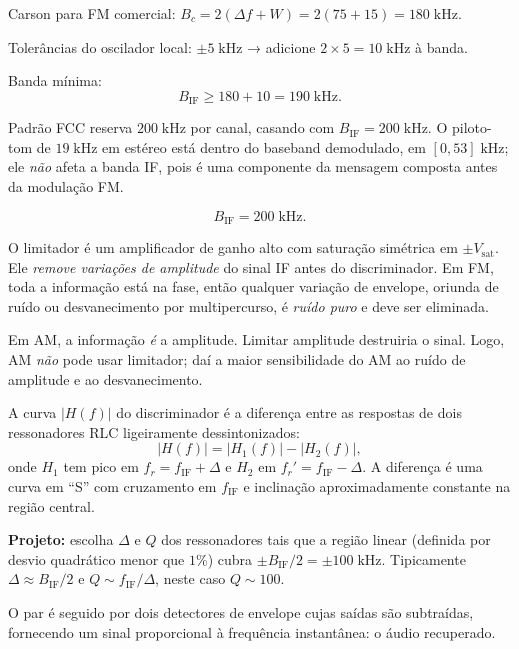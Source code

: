\documentclass[11pt,a4paper]{article}
\begin{document}
\begin{resolucao}

Carson para FM comercial: $B_c = 2(\Delta f + W) = 2(75 + 15) = 180\;\text{kHz}$.

Tolerâncias do oscilador local: $\pm 5\;\text{kHz}$ → adicione $2 \times 5 = 10\;\text{kHz}$ à banda.

Banda mínima:
\[
  B_{\text{IF}} \ge 180 + 10 = 190\;\text{kHz}.
\]

Padrão FCC reserva $200\;\text{kHz}$ por canal, casando com $B_{\text{IF}} = 200\;\text{kHz}$. O piloto-tom de $19\;\text{kHz}$ em estéreo está dentro do baseband demodulado, em $[0, 53]\;\text{kHz}$; ele \emph{não} afeta a banda IF, pois é uma componente da mensagem composta antes da modulação FM.

\[
  \boxed{B_{\text{IF}} = 200\;\text{kHz}.}
\]
\end{resolucao}

\begin{resolucao}

O limitador é um amplificador de ganho alto com saturação simétrica em $\pm V_{\text{sat}}$. Ele \emph{remove variações de amplitude} do sinal IF antes do discriminador. Em FM, toda a informação está na fase, então qualquer variação de envelope, oriunda de ruído ou desvanecimento por multipercurso, é \emph{ruído puro} e deve ser eliminada.

Em AM, a informação \emph{é} a amplitude. Limitar amplitude destruiria o sinal. Logo, AM \emph{não} pode usar limitador; daí a maior sensibilidade do AM ao ruído de amplitude e ao desvanecimento.
\end{resolucao}

\begin{resolucao}

A curva $|H(f)|$ do discriminador é a diferença entre as respostas de dois ressonadores RLC ligeiramente dessintonizados:
\[
  |H(f)| = |H_1(f)| - |H_2(f)|,
\]
onde $H_1$ tem pico em $f_r = f_{\text{IF}} + \Delta$ e $H_2$ em $f_r' = f_{\text{IF}} - \Delta$. A diferença é uma curva em ``S'' com cruzamento em $f_{\text{IF}}$ e inclinação aproximadamente constante na região central.

\textbf{Projeto:} escolha $\Delta$ e $Q$ dos ressonadores tais que a região linear (definida por desvio quadrático menor que $1\%$) cubra $\pm B_{\text{IF}}/2 = \pm 100\;\text{kHz}$. Tipicamente $\Delta \approx B_{\text{IF}}/2$ e $Q \sim f_{\text{IF}}/\Delta$, neste caso $Q \sim 100$.

O par é seguido por dois detectores de envelope cujas saídas são subtraídas, fornecendo um sinal proporcional à frequência instantânea: o áudio recuperado.
\end{resolucao}
\end{document}
